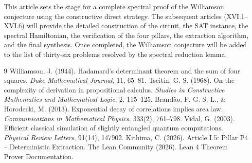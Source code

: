 \documentclass[11pt,a4paper]{article}
\begin{document}
This article sets the stage for a complete spectral proof of the Williamson conjecture using the constructive direct strategy. The subsequent articles (XVI.1–XVI.6) will provide the detailed construction of the circuit, the SAT instance, the spectral Hamiltonian, the verification of the four pillars, the extraction algorithm, and the final synthesis. Once completed, the Williamson conjecture will be added to the list of thirty‑six problems resolved by the spectral reduction lemma.


\begin{thebibliography}{9}
  Williamson, J. (1944). Hadamard's determinant theorem and the sum of four squares. \emph{Duke Mathematical Journal}, 11, 65–81.
  Tseitin, G. S. (1968). On the complexity of derivation in propositional calculus. \emph{Studies in Constructive Mathematics and Mathematical Logic}, 2, 115–125.
  Brandão, F. G. S. L., \& Horodecki, M. (2013). Exponential decay of correlations implies area law. \emph{Communications in Mathematical Physics}, 333(2), 761–798.
  Vidal, G. (2003). Efficient classical simulation of slightly entangled quantum computations. \emph{Physical Review Letters}, 91(14), 147902.
  Kithima, C. (2026). Article I.5: Pillar P4 – Deterministic Extraction.
  The Lean Community (2026). Lean 4 Theorem Prover Documentation.
\end{thebibliography}
\end{document}
